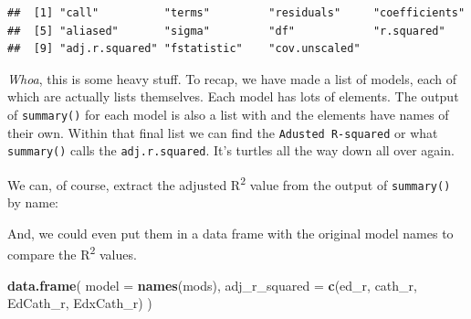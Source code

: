 \documentclass[
]{book}
\newenvironment{Shaded}{\begin{snugshade}}{\end{snugshade}}
\newcommand{\CommentTok}[1]{\textcolor[rgb]{0.56,0.35,0.01}{\textit{#1}}}
\newcommand{\DataTypeTok}[1]{\textcolor[rgb]{0.13,0.29,0.53}{#1}}
\newcommand{\KeywordTok}[1]{\textcolor[rgb]{0.13,0.29,0.53}{\textbf{#1}}}
\newcommand{\NormalTok}[1]{#1}
\newcommand{\OperatorTok}[1]{\textcolor[rgb]{0.81,0.36,0.00}{\textbf{#1}}}
\newcommand{\StringTok}[1]{\textcolor[rgb]{0.31,0.60,0.02}{#1}}
\begin{document}
\begin{Shaded}
\end{Shaded}

\begin{verbatim}
##  [1] "call"          "terms"         "residuals"     "coefficients" 
##  [5] "aliased"       "sigma"         "df"            "r.squared"    
##  [9] "adj.r.squared" "fstatistic"    "cov.unscaled"
\end{verbatim}

\emph{Whoa}, this is some heavy stuff. To recap, we have made a list of models, each of which are actually lists themselves. Each model has lots of elements. The output of \texttt{summary()} for each model is also a list with and the elements have names of their own. Within that final list we can find the \texttt{Adusted\ R-squared} or what \texttt{summary()} calls the \texttt{adj.r.squared}. It's turtles all the way down all over again.

We can, of course, extract the adjusted R\textsuperscript{2} value from the output of \texttt{summary()} by name:

\begin{Shaded}
\end{Shaded}

And, we could even put them in a data frame with the original model names to compare the R\textsuperscript{2} values.

\begin{Shaded}
\begin{Highlighting}[]
\KeywordTok{data.frame}\NormalTok{(}
  \DataTypeTok{model =} \KeywordTok{names}\NormalTok{(mods),}
  \DataTypeTok{adj_r_squared =} \KeywordTok{c}\NormalTok{(ed_r, cath_r, EdCath_r, EdxCath_r)}
\NormalTok{)}
\end{Highlighting}
\end{Shaded}
\end{document}
